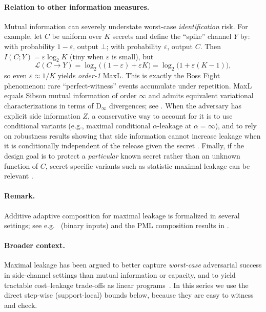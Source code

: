 \documentclass[11pt]{article}
\newcommand{\Dinfty}{\mathrm{D_{\infty}}}
\newcommand{\MaxL}{\mathcal{L}}
\newcommand{\logtwo}{\log_2}
\begin{document}
\paragraph{Relation to other information measures.}
Mutual information can severely understate worst-case \emph{identification} risk.
For example, let $C$ be uniform over $K$ secrets and define the ``spike'' channel $Y$ by: with probability $1-\varepsilon$, output $\bot$; with probability $\varepsilon$, output $C$.
Then $I(C;Y)=\varepsilon\logtwo K$ (tiny when $\varepsilon$ is small), but
\[
\MaxL(C\!\to\!Y)=\logtwo\big((1-\varepsilon)+\varepsilon K\big)=\logtwo\big(1+\varepsilon(K-1)\big),
\]
so even $\varepsilon\approx 1/K$ yields \emph{order-1} MaxL.
This is exactly the Boss Fight phenomenon: rare ``perfect-witness'' events accumulate under repetition.
MaxL equals Sibson mutual information of order $\infty$ and admits equivalent variational characterizations in terms of $\Dinfty$ divergences; see \cite{issa2016sibson,issa2020operational,esposito2019renyi}.
When the adversary has explicit side information $Z$, a conservative way to account for it is to use conditional variants (e.g., maximal conditional $\alpha$-leakage at $\alpha=\infty$), and to rely on robustness results showing that side information cannot increase leakage when it is conditionally independent of the release given the secret \cite{liao2019sideinfo,liao2020malprops}.
Finally, if the design goal is to protect a \emph{particular} known secret rather than an unknown function of $C$, secret-specific variants such as statistic maximal leakage can be relevant \cite{wang2024statmaxl}.

\paragraph{Remark.} Additive adaptive composition for maximal leakage is formalized in several settings; see e.g.\ \cite{issa2022adaptive} (binary inputs) and the PML composition results in \cite{saeidian2023pml}.



\paragraph{Broader context.}
Maximal leakage has been argued to better capture \emph{worst-case} adversarial success in side-channel settings than mutual information or capacity, and to yield tractable cost--leakage trade-offs as linear programs~\cite{wu2020sidechannel}.
In this series we use the direct step-wise (support-local) bounds below, because they are easy to witness and check.
\end{document}
